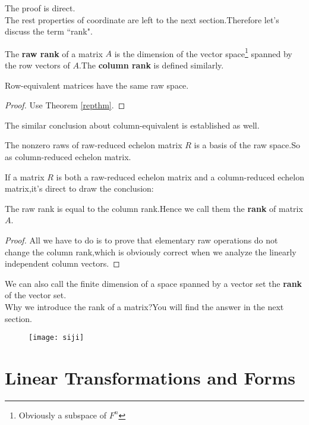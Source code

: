 \documentclass{article}
\begin{document}
The proof is direct.\\
\indent The rest properties of coordinate are left to the next section.Therefore let's discuss the term ``rank".
\begin{dde}
	The \textbf{raw rank} of a matrix $A$ is the dimension of the vector space\footnote{Obviously a subspace of $F^n$} spanned by the row vectors of $A$.The \textbf{column rank} is defined similarly.
\end{dde}
\begin{thm}
	Row-equivalent matrices have the same raw space. 
\end{thm}
\begin{proof}
	Use Theorem \ref{repthm}.
\end{proof}
The similar conclusion about column-equivalent is established as well.
\begin{thm}
	The nonzero raws of raw-reduced echelon matrix $R$ is a basis of the raw space.So as column-reduced echelon matrix.
\end{thm}
If a matrix $R$ is both a raw-reduced echelon matrix and a column-reduced echelon matrix,it's direct to draw the conclusion:
\begin{thm}
	The raw rank is equal to the column rank.Hence we call them the \textbf{rank} of matrix $A$.
\end{thm}
\begin{proof}
	All we have to do is to prove that elementary raw operations do not change the column rank,which is obviously correct when we analyze the linearly independent column vectors.
\end{proof}
We can also call the finite dimension of a space spanned by a vector set the \textbf{rank} of the vector set.\\
\indent Why we introduce the rank of a matrix?You will find the answer in the next section.
\begin{figure}[htbp]
	\centering
	\texttt{[image: siji]}
\end{figure}
\newpage
\section{Linear Transformations and Forms}\label{3}
\end{document}
